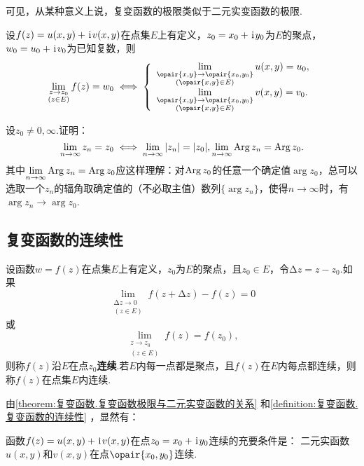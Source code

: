 可见，从某种意义上说，复变函数的极限类似于二元实变函数的极限.
\begin{theorem}\label{theorem:复变函数.复变函数极限与二元实变函数的关系}
设\(f(z)=u(x,y)+\kern1pt\mathrm{i}\kern1pt v(x,y)\)在点集\(E\)上有定义，\(z_0=x_0+\kern1pt\mathrm{i}\kern1pt y_0\)为\(E\)的聚点，\(w_0=u_0+\kern1pt\mathrm{i}\kern1pt v_0\)为已知复数，则\[
\lim\limits_{\substack{z \to z_0 \\ (z \in E)}} f(z) = w_0
\iff
\left\{ \begin{array}{l}
\lim\limits_{\substack{\opair{x,y}\to\opair{x_0,y_0} \\ (\opair{x,y} \in E)}} u(x,y) = u_0, \\
\lim\limits_{\substack{\opair{x,y}\to\opair{x_0,y_0} \\ (\opair{x,y} \in E)}} v(x,y) = v_0.
\end{array} \right.
\]
\end{theorem}

\begin{example}
设\(z_0\neq0,\infty\).证明：\[
\lim\limits_{n\to\infty} z_n = z_0
\iff
\lim\limits_{n\to\infty} \abs{z_n} = \abs{z_0},
\lim\limits_{n\to\infty} \operatorname{Arg} z_n = \operatorname{Arg} z_0.
\]其中\(\lim\limits_{n\to\infty} \operatorname{Arg} z_n = \operatorname{Arg} z_0\)应这样理解：对\(\operatorname{Arg} z_0\)的任意一个确定值\(\arg z_0\)，总可以选取一个\(z_n\)的辐角取确定值的（不必取主值）数列\(\{ \arg z_n \}\)，使得\(n\to\infty\)时，有\(\arg z_n \to \arg z_0\).
\end{example}

\subsection{复变函数的连续性}
\begin{definition}\label{definition:复变函数.复变函数的连续性}
设函数\(w=f(z)\)在点集\(E\)上有定义，\(z_0\)为\(E\)的聚点，且\(z_0 \in E\)，令\(\increment z = z - z_0\).如果\[
\lim\limits_{\substack{\increment z\to0 \\ (z \in E)}} f(z+\increment z) - f(z) = 0
\]或\[
\lim\limits_{\substack{z \to z_0 \\ (z \in E)}} f(z) = f(z_0),
\]则称\(f(z)\)沿\(E\)在点\(z_0\)\textbf{连续}.若\(E\)内每一点都是聚点，且\(f(z)\)在\(E\)内每点都连续，则称\(f(z)\)在点集\(E\)内连续.
\end{definition}

由\cref{theorem:复变函数.复变函数极限与二元实变函数的关系} 和\cref{definition:复变函数.复变函数的连续性} ，显然有：
\begin{theorem}
函数\(f(z)=u(x,y)+\kern1pt\mathrm{i}\kern1pt v(x,y)\)在点\(z_0=x_0+\kern1pt\mathrm{i}\kern1pt y_0\)连续的充要条件是：
二元实函数\(u(x,y)\)和\(v(x,y)\)在点\(\opair{x_0,y_0}\)连续.
\end{theorem}

